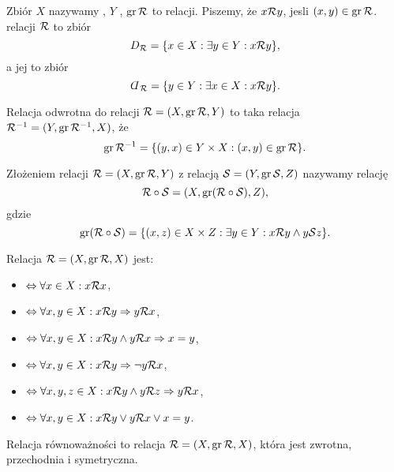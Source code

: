 \documentclass[11pt]{scrartcl}
\begin{document}
    Zbiór $X$ nazywamy , $Y$ , $\operatorname{gr} \mathcal R$ to  relacji. Piszemy, że $x \mathcal R y$, jesli $(x, y) \in \operatorname{gr}\mathcal R$.  relacji $\mathcal R$ to zbiór
    $$ D_\mathcal R = \{x \in X : \exists y \in Y : x \mathcal R y\}, $$
    a jej  to zbiór
    $$ \rotatebox[origin=c]{180}{$D$}_\sR = \{y \in Y : \exists x \in X : x \sR y\}. $$

    \begin{definition}
        Relacja odwrotna do relacji $\mathcal R = (X, \operatorname{gr}\mathcal R, Y)$ to taka relacja $\mathcal R^{-1} = (Y, \operatorname{gr}\mathcal R^{-1}, X)$, że
        $$ \operatorname{gr} \mathcal R^{-1} = \{(y, x) \in Y \times X : (x, y) \in \operatorname{gr}\mathcal R\}. $$
    \end{definition}

    \begin{definition}
        Złożeniem relacji $\mathcal R = (X, \operatorname{gr}\mathcal R, Y)$ z relacją $\mathcal S = (Y, \operatorname{gr}\mathcal S, Z)$ nazywamy relację
        $$ \mathcal R \circ \mathcal S = (X, \operatorname{gr}(\mathcal R \circ \mathcal S), Z), $$
        gdzie
        $$ \operatorname{gr}(\mathcal R \circ \mathcal S) = \{(x, z) \in X \times Z : \exists y \in Y : x \mathcal R y \wedge y \mathcal S z\}. $$
    \end{definition}

    \begin{definition}
        Relacja $\mathcal R = (X, \operatorname{gr}\mathcal R, X)$ jest:
        \begin{itemize}[--]
            \item {} $\Leftrightarrow \forall x\in X : x \mathcal R x$,
            \item {} $\Leftrightarrow \forall x, y \in X : x \mathcal R y \Rightarrow y \mathcal R x$,
            \item {} $\Leftrightarrow \forall x, y \in X : x \mathcal R y \wedge y \mathcal R x \Rightarrow x = y$,
            \item {} $\Leftrightarrow \forall x, y \in X : x \mathcal R y \Rightarrow \neg y \mathcal R x$,
            \item {} $\Leftrightarrow \forall x, y, z \in X : x \mathcal R y \wedge y \mathcal R z \Rightarrow y \mathcal R x$,
            \item {} $\Leftrightarrow \forall x, y \in X : x \mathcal R y \vee y \mathcal R x \vee x = y$.
        \end{itemize}
    \end{definition}

    \begin{definition}
        Relacja równoważności to relacja $\mathcal R = (X, \operatorname{gr}\mathcal R, X)$, która jest zwrotna, przechodnia i symetryczna.
    \end{definition}
\end{document}
